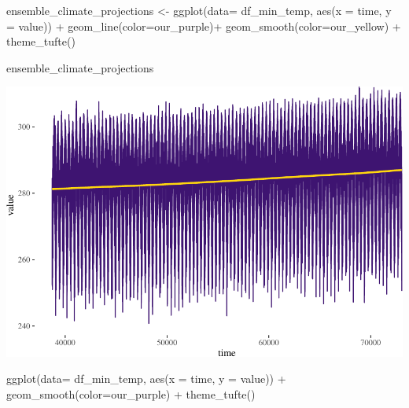 \documentclass[
  paper=a4,
  ,captions=tableheading
]{scrartcl}
\newenvironment{Shaded}{\begin{snugshade}}{\end{snugshade}}
\newcommand{\AttributeTok}[1]{\textcolor[rgb]{0.77,0.63,0.00}{#1}}
\newcommand{\FunctionTok}[1]{\textcolor[rgb]{0.00,0.00,0.00}{#1}}
\newcommand{\NormalTok}[1]{#1}
\newcommand{\OtherTok}[1]{\textcolor[rgb]{0.56,0.35,0.01}{#1}}
\newcommand{\SpecialCharTok}[1]{\textcolor[rgb]{0.00,0.00,0.00}{#1}}
\begin{document}
\begin{Shaded}
\begin{Highlighting}[]
\NormalTok{ensemble\_climate\_projections }\OtherTok{\textless{}{-}} \FunctionTok{ggplot}\NormalTok{(}\AttributeTok{data=}\NormalTok{ df\_min\_temp, }\FunctionTok{aes}\NormalTok{(}\AttributeTok{x =}\NormalTok{ time, }\AttributeTok{y =}\NormalTok{ value)) }\SpecialCharTok{+} 
  \FunctionTok{geom\_line}\NormalTok{(}\AttributeTok{color=}\NormalTok{our\_purple)}\SpecialCharTok{+}
  \FunctionTok{geom\_smooth}\NormalTok{(}\AttributeTok{color=}\NormalTok{our\_yellow) }\SpecialCharTok{+}
  \FunctionTok{theme\_tufte}\NormalTok{()}
  

\NormalTok{ensemble\_climate\_projections}
\end{Highlighting}
\end{Shaded}

\includegraphics{Haskell_files/figure-latex/unnamed-chunk-52-1.pdf}

\begin{Shaded}
\begin{Highlighting}[]
\FunctionTok{ggplot}\NormalTok{(}\AttributeTok{data=}\NormalTok{ df\_min\_temp, }\FunctionTok{aes}\NormalTok{(}\AttributeTok{x =}\NormalTok{ time, }\AttributeTok{y =}\NormalTok{ value)) }\SpecialCharTok{+} 
  \FunctionTok{geom\_smooth}\NormalTok{(}\AttributeTok{color=}\NormalTok{our\_purple) }\SpecialCharTok{+}
  \FunctionTok{theme\_tufte}\NormalTok{()}
\end{Highlighting}
\end{Shaded}
\end{document}
